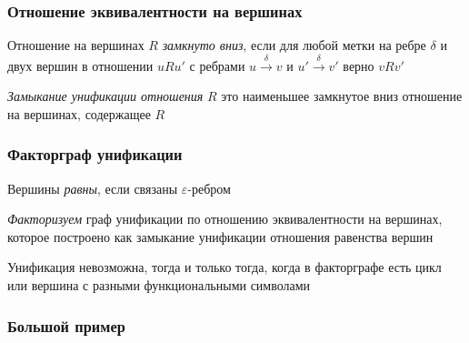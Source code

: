 \documentclass[aspectratio=169]{beamer}
\begin{document}
\begin{frame}[fragile]
  \frametitle{Отношение эквивалентности на вершинах}
Отношение на вершинах $R$ \textit{замкнуто вниз}, если для любой метки на ребре $\delta$ и двух вершин в отношении $uRu'$ с ребрами $u \xrightarrow{\delta} v$ и $u' \xrightarrow{\delta} v'$ верно $vRv'$

\begin{center}
\end{center}

\bigskip

\textit{Замыкание унификации отношения} $R$ это наименьшее замкнутое вниз отношение на вершинах, содержащее $R$
\end{frame}

\begin{frame}[fragile]
  \frametitle{Факторграф унификации}
Вершины \textit{равны}, если связаны $\varepsilon$-ребром

\bigskip

\textit{Факторизуем} граф унификации по отношению эквивалентности на вершинах, которое построено как замыкание унификации отношения равенства вершин

\pause

\begin{center}
  
\end{center}

Унификация невозможна, тогда и только тогда, когда в факторграфе есть цикл или вершина с разными функциональными символами
\end{frame}


\begin{frame}[fragile]
  \frametitle{Большой пример}

  \begin{columns}
    \begin{column}{0.3\textwidth}
      
      \pause
    \end{column}
    \begin{column}{0.7\textwidth}
      \begin{center}
        
      \end{center}
    \end{column}
    \end{columns}

\end{frame}
\end{document}
